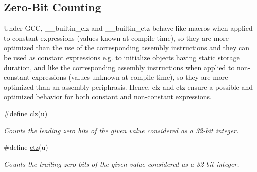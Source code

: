 \subsection*{Zero-\/\+Bit Counting}
\label{_amgrpd7e64f1bf7ad6347e17b23a92fc56d83}%
Under G\+CC, \+\_\+\+\_\+builtin\+\_\+clz and \+\_\+\+\_\+builtin\+\_\+ctz behave like macros when applied to constant expressions (values known at compile time), so they are more optimized than the use of the corresponding assembly instructions and they can be used as constant expressions e.\+g. to initialize objects having static storage duration, and like the corresponding assembly instructions when applied to non-\/constant expressions (values unknown at compile time), so they are more optimized than an assembly periphrasis. Hence, clz and ctz ensure a possible and optimized behavior for both constant and non-\/constant expressions. \begin{DoxyCompactItemize}
\item 
\#define \mbox{\hyperlink{group__group__sam0__utils_ga004f88903a09b9c23017e697eaf5a845}{clz}}(u)
\begin{DoxyCompactList}\small\item\em Counts the leading zero bits of the given value considered as a 32-\/bit integer. \end{DoxyCompactList}\item 
\#define \mbox{\hyperlink{group__group__sam0__utils_gab069bfec305db5213465d3b689836404}{ctz}}(u)
\begin{DoxyCompactList}\small\item\em Counts the trailing zero bits of the given value considered as a 32-\/bit integer. \end{DoxyCompactList}\end{DoxyCompactItemize}
